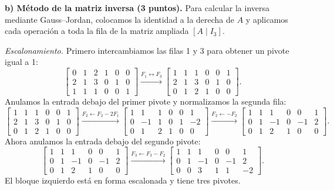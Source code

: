 \documentclass[10pt,a4]{examenEPN0}
\begin{document}
\noindent\textbf{b) Método de la matriz inversa (3 puntos).}
Para calcular la inversa mediante Gauss--Jordan, colocamos la identidad
a la derecha de $A$ y aplicamos cada operación a toda la fila de la
matriz ampliada $[A\mid I_3]$.

\noindent\textit{Escalonamiento.} Primero intercambiamos las filas 1 y 3
para obtener un pivote igual a 1:
\[
    \left[\begin{array}{ccc|ccc}
        0&1&2&1&0&0\\2&1&3&0&1&0\\1&1&1&0&0&1
    \end{array}\right]
    \xrightarrow{F_1\leftrightarrow F_3}
    \left[\begin{array}{ccc|ccc}
        1&1&1&0&0&1\\2&1&3&0&1&0\\0&1&2&1&0&0
    \end{array}\right].
\]
Anulamos la entrada debajo del primer pivote y normalizamos la segunda fila:
\[
    \left[\begin{array}{ccc|ccc}
        1&1&1&0&0&1\\2&1&3&0&1&0\\0&1&2&1&0&0
    \end{array}\right]
    \xrightarrow{F_2\leftarrow F_2-2F_1}
    \left[\begin{array}{ccc|ccc}
        1&1&1&0&0&1\\0&-1&1&0&1&-2\\0&1&2&1&0&0
    \end{array}\right]
    \xrightarrow{F_2\leftarrow -F_2}
    \left[\begin{array}{ccc|ccc}
        1&1&1&0&0&1\\0&1&-1&0&-1&2\\0&1&2&1&0&0
    \end{array}\right].
\]
Ahora anulamos la entrada debajo del segundo pivote:
\[
    \left[\begin{array}{ccc|ccc}
        1&1&1&0&0&1\\0&1&-1&0&-1&2\\0&1&2&1&0&0
    \end{array}\right]
    \xrightarrow{F_3\leftarrow F_3-F_2}
    \left[\begin{array}{ccc|ccc}
        1&1&1&0&0&1\\0&1&-1&0&-1&2\\0&0&3&1&1&-2
    \end{array}\right].
\]
El bloque izquierdo está en forma escalonada y tiene tres pivotes.
\end{document}
